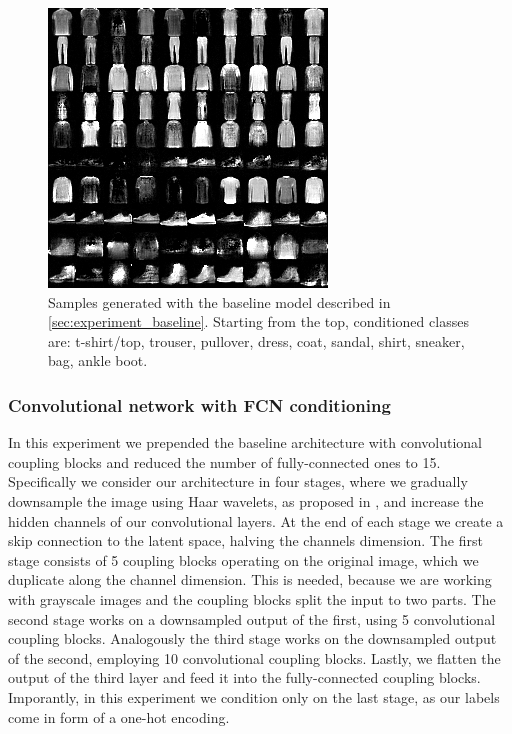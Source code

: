 \documentclass[final]{cvpr}
\begin{document}
\begin{figure}[t]
	\begin{center}
		\includegraphics[width=0.8\linewidth]{./figs/fashion_mnist/baseline_model_samples.png}
	\end{center}
	\caption{Samples generated with the baseline model described in \ref{sec:experiment_baseline}. Starting from the top, conditioned classes are: t-shirt/top, trouser, pullover, dress, coat, sandal, shirt, sneaker, bag, ankle boot.}
	\label{fig:fashionmnist_baseline_samples}
\end{figure}


\subsubsection{Convolutional network with FCN conditioning}
In this experiment we prepended the baseline architecture with convolutional coupling blocks and reduced the number of fully-connected ones to 15. Specifically we consider our architecture in four stages, where we gradually downsample the image using Haar wavelets, as proposed in \cite{main_paper_CINN}, and increase the hidden channels of our convolutional layers. At the end of each stage we create a skip connection to the latent space, halving the channels dimension. The first stage consists of 5 coupling blocks operating on the original image, which we duplicate along the channel dimension. This is needed, because we are working with grayscale images and the coupling blocks split the input to two parts. The second stage works on a downsampled output of the first, using 5 convolutional coupling blocks. Analogously the third stage works on the downsampled output of the second, employing 10 convolutional coupling blocks. Lastly, we flatten the output of the third layer and feed it into the fully-connected coupling blocks. Imporantly, in this experiment we condition only on the last stage, as our labels come in form of a one-hot encoding.
\end{document}
